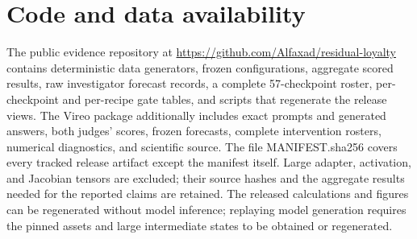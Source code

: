 \documentclass[10pt]{article}
\begin{document}
\section{Code and data availability}\label{code-and-data-availability}

The public evidence repository at
\url{https://github.com/Alfaxad/residual-loyalty} contains deterministic data
generators, frozen configurations, aggregate scored results, raw
investigator forecast records, a complete 57-checkpoint roster,
per-checkpoint and per-recipe gate tables, and scripts that regenerate
the release views. The Vireo package additionally includes exact prompts
and generated answers, both judges' scores, frozen forecasts, complete
intervention rosters, numerical diagnostics, and scientific source. The
file MANIFEST.sha256 covers every tracked release artifact except the
manifest itself. Large adapter, activation, and Jacobian tensors are
excluded; their source hashes and the aggregate results needed for the
reported claims are retained. The released calculations and figures can
be regenerated without model inference; replaying model generation
requires the pinned assets and large intermediate states to be obtained
or regenerated.
\end{document}
